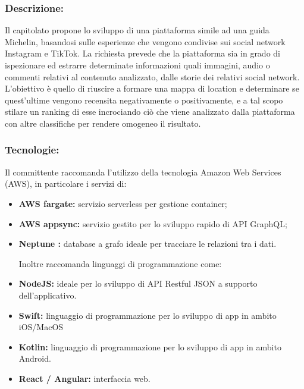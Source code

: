 \subsubsection{Descrizione:}
Il capitolato propone lo sviluppo di una piattaforma simile ad una guida Michelin, basandosi sulle esperienze che vengono condivise sui social network Instagram e TikTok.
La richiesta prevede che la piattaforma sia in grado di ispezionare ed estrarre determinate informazioni quali immagini, audio o commenti relativi al contenuto analizzato, dalle storie dei relativi social network.
L’obiettivo è quello di riuscire a formare una mappa di location e determinare se quest’ultime vengono recensita negativamente o positivamente, e a tal scopo stilare un ranking di esse incrociando ciò che viene analizzato dalla piattaforma con altre classifiche per rendere omogeneo il risultato.
\subsubsection{Tecnologie:}
Il committente raccomanda l’utilizzo della tecnologia Amazon Web Services (AWS), in particolare i servizi di:
\begin{itemize}
	\item \textbf{AWS fargate:} servizio serverless per gestione container;
	\item \textbf{AWS appsync:} servizio gestito per lo sviluppo rapido di API GraphQL;
	\item \textbf{Neptune :} database a grafo ideale per tracciare le relazioni tra i dati.
	
	Inoltre raccomanda linguaggi di programmazione come:
	\item \textbf{NodeJS:} ideale per lo sviluppo di API Restful JSON a supporto dell’applicativo.
	\item \textbf{Swift:} linguaggio di programmazione per lo sviluppo di app in ambito iOS/MacOS
	\item \textbf{Kotlin:} linguaggio di programmazione per lo sviluppo di app in ambito Android.
	\item \textbf{React / Angular:} interfaccia web.
\end{itemize}

